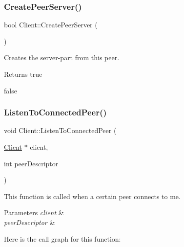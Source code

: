 \subsubsection{\texorpdfstring{Create\+Peer\+Server()}{CreatePeerServer()}}
{\footnotesize\ttfamily bool Client\+::\+Create\+Peer\+Server (\begin{DoxyParamCaption}{ }\end{DoxyParamCaption})}



Creates the server-\/part from this peer. 

\begin{DoxyReturn}{Returns}
true 

false 
\end{DoxyReturn}
\mbox{\label{class_client_ab94c5088dc0e8924cd2803cfea1baed6}} 
\subsubsection{\texorpdfstring{Listen\+To\+Connected\+Peer()}{ListenToConnectedPeer()}}
{\footnotesize\ttfamily void Client\+::\+Listen\+To\+Connected\+Peer (\begin{DoxyParamCaption}\item[{\mbox{\hyperlink{class_client}{Client}} $\ast$}]{client,  }\item[{int}]{peer\+Descriptor }\end{DoxyParamCaption})\hspace{0.3cm}{\ttfamily [static]}}



This function is called when a certain peer connects to me. 


\begin{DoxyParams}{Parameters}
{\em client} & \\
\hline
{\em peer\+Descriptor} & \\
\hline
\end{DoxyParams}
Here is the call graph for this function\+:
